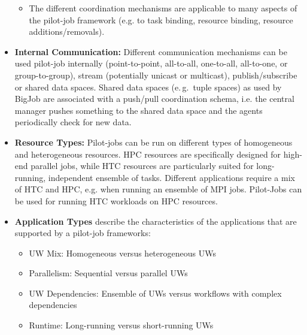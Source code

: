 \documentclass[]{article}
\begin{document}
\begin{itemize}
\begin{itemize}
			\item The different coordination mechanisms are applicable to many 
			aspects of the pilot-job framework 
			(e.g. to task binding, resource binding, resource 
			additions/removals).    		
		\end{itemize}
		
\item \textbf{Internal Communication:} Different communication 
       	mechanisms can be used pilot-job  internally  (point-to-point, 
       	all-to-all, one-to-all, all-to-one, or group-to-group),
        stream (potentially unicast or multicast), publish/subscribe or      
        shared data spaces. Shared data spaces (e.\,g.\ tuple spaces) as used by 
        BigJob are associated with a push/pull coordination schema, i.e. the 
        central manager pushes something to the shared data space and the agents 
        periodically check for new data.
       	
		
\item \textbf{Resource Types:} Pilot-jobs can be run on different 
types of homogeneous and heterogeneous resources. HPC resources are specifically 
designed for high-end parallel jobs, while HTC resources are particularly suited 
for long-running, independent 
ensemble of tasks. Different applications require a mix of HTC and HPC, e.g. 
when running an ensemble of MPI jobs. Pilot-Jobs can be used for running HTC 
workloads on HPC resources. 

\item \textbf{Application Types} describe the characteristics of the 
applications that are supported by a pilot-job frameworks:
\begin{itemize}
    \item UW Mix: Homogeneous versus heterogeneous UWs
    \item Parallelism: Sequential versus parallel UWs
    \item UW Dependencies: Ensemble of UWs versus workflows with complex 
    dependencies
    \item Runtime: Long-running versus short-running UWs
\end{itemize}


\end{itemize}
\end{document}
